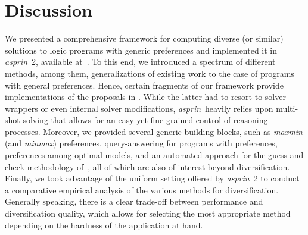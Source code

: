 \documentclass[a4paper,USenglish]{oasics-v2016}
\newcommand{\sysfont}{\textit}
\newcommand{\asprin}{\sysfont{asprin}}
\begin{document}
\section{Discussion}\label{sec:discussion}

We presented a comprehensive framework for computing diverse (or similar) solutions to logic programs with generic preferences
and implemented it in \asprin~2, available at~\cite{asprin}. %
To this end, we introduced a spectrum of different methods, among them, generalizations of existing work to the case of
programs with general preferences.
Hence, certain fragments of our framework provide implementations of the proposals in \cite{eiererfi13a,zhutru13a}.
While the latter had to resort to solver wrappers or even internal solver modifications,
\asprin\ heavily relies upon multi-shot solving that allows for an easy yet fine-grained control of reasoning processes.
Moreover, we provided several generic building blocks, such as 
\textit{maxmin} (and \textit{minmax}) preferences,
query-answering for programs with preferences,
preferences among optimal models,
and an automated approach for the guess and check methodology of~\cite{eitpol06a},
all of which are also of interest beyond diversification.
%
Finally, we took advantage of the uniform setting offered by \asprin~2 to conduct a 
comparative empirical analysis of the various methods for diversification.
Generally speaking,
there is a clear trade-off between performance and diversification quality, 
which allows for selecting the most appropriate method 
depending on the hardness of the application at hand.
 
\end{document}
